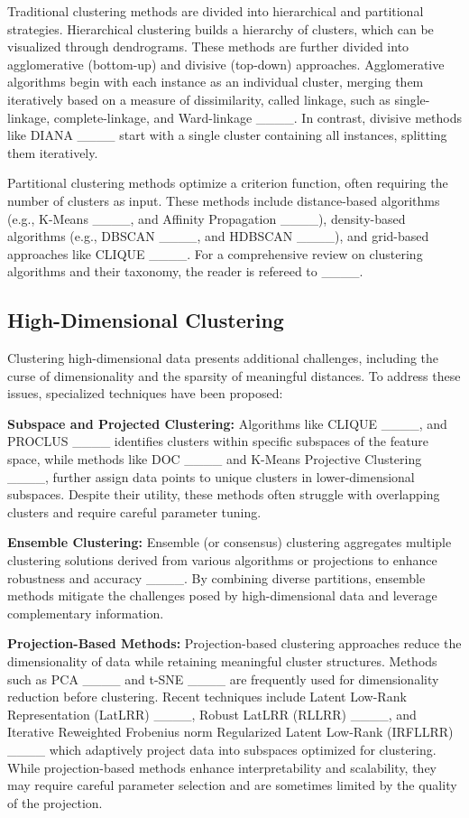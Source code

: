 Traditional clustering methods are divided into hierarchical and partitional strategies. Hierarchical clustering builds a hierarchy of clusters, which can be visualized through dendrograms. These methods are further divided into agglomerative (bottom-up) and divisive (top-down) approaches. Agglomerative algorithms begin with each instance as an individual cluster, merging them iteratively based on a measure of dissimilarity, called linkage, such as single-linkage, complete-linkage, and Ward-linkage ____. In contrast, divisive methods like DIANA ____ start with a single cluster containing all instances, splitting them iteratively.

Partitional clustering methods optimize a criterion function, often requiring the number of clusters as input. These methods include distance-based algorithms (e.g., K-Means ____, and Affinity Propagation ____), density-based algorithms (e.g., DBSCAN ____, and HDBSCAN ____), and grid-based approaches like CLIQUE ____. For a comprehensive review on clustering algorithms and their taxonomy, the reader is refereed to ____.


\subsection{High-Dimensional Clustering}


Clustering high-dimensional data presents additional challenges, including the curse of dimensionality and the sparsity of meaningful distances. To address these issues, specialized techniques have been proposed:

\textbf{Subspace and Projected Clustering:} Algorithms like CLIQUE ____, and PROCLUS ____ identifies clusters within specific subspaces of the feature space, while methods like DOC ____ and K-Means Projective Clustering ____, further assign data points to unique clusters in lower-dimensional subspaces. Despite their utility, these methods often struggle with overlapping clusters and require careful parameter tuning.

\textbf{Ensemble Clustering:} Ensemble (or consensus) clustering aggregates multiple clustering solutions derived from various algorithms or projections to enhance robustness and accuracy ____. By combining diverse partitions, ensemble methods mitigate the challenges posed by high-dimensional data and leverage complementary information.

\textbf{Projection-Based Methods:} Projection-based clustering approaches reduce the dimensionality of data while retaining meaningful cluster structures. Methods such as PCA ____ and t-SNE ____ are frequently used for dimensionality reduction before clustering. Recent techniques include Latent Low-Rank Representation (LatLRR) ____, Robust LatLRR (RLLRR) ____, and Iterative Reweighted Frobenius norm Regularized Latent Low-Rank (IRFLLRR) ____ which adaptively project data into subspaces optimized for clustering. While projection-based methods enhance interpretability and scalability, they may require careful parameter selection and are sometimes limited by the quality of the projection.

